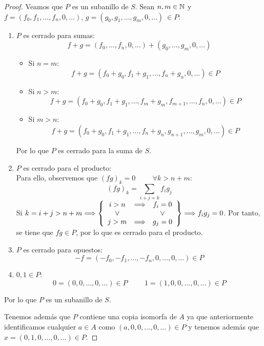 \begin{proof}
    
    Veamos que $P$ es un subanillo de $S$. Sean $n,m \in \mathbb N$ y $f=(f_0, f_1, \ldots, f_n, 0, \ldots)$, $g=(g_0, g_1, \ldots, g_m, 0, \ldots)~\in P$:
    \begin{enumerate}
        \item $P$ es cerrado para sumas:
        $$f+g = (f_0, \ldots, f_n, 0, \ldots) + (g_0, \ldots, g_m, 0, \ldots)$$
        \begin{itemize}
            \item Si $n = m$: $$f+g = (f_0 + g_0, f_1 + g_1, \ldots, f_n + g_n, 0, \ldots) \in P$$
            \item Si $n > m$: $$f+g = (f_0 + g_0, f_1 + g_1, \ldots, f_m + g_m, f_{m+1}, \ldots, f_n, 0, \ldots) \in P$$
            \item Si $m > n$: $$f+g = (f_0 + g_0, f_1 + g_1, \ldots, f_n + g_n, g_{n+1}, \ldots, g_m, 0, \ldots) \in P$$
        \end{itemize}
        Por lo que $P$ es cerrado para la suma de $S$.

        \item $P$ es cerrado para el producto:\\
        Para ello, observemos que $(fg)_k = 0 \hspace{1cm} \forall k > n+m$:
        $$(fg)_k = \sum_{i+j=k} f_i g_j$$
        Si $k = i+j > n+m \Longrightarrow 
        \left\{\begin{array}{ccc}
            i>n & \Longrightarrow & f_i=0\\
            \ \lor \  && \ \lor \ \\
            j>m & \Longrightarrow & g_j=0
        \end{array}\right\}
        \Longrightarrow f_i g_j = 0$.
        Por tanto, se tiene que $fg \in P$, por lo que es cerrado para el producto.

        \item $P$ es cerrado para opuestos:
        $$-f = (-f_0, -f_1, \ldots, -f_n, 0, \ldots, 0, \ldots) \in P$$

        \item $0,1\in P$:
        $$0 = (0, 0, \ldots, 0, \ldots) \in P \hspace{1cm} 1 = (1, 0, 0, \ldots, 0, \ldots) \in P$$
    \end{enumerate}
    
    Por lo que $P$ es un subanillo de $S$.

    
    Tenemos además que $P$ contiene una copia isomorfa de $A$ ya que anteriormente identificamos cualquier $a \in A$ como $(a, 0, 0, \ldots, 0, \ldots) \in P$ y tenemos además que $x = (0, 1, 0, \ldots, 0, \ldots) \in P$.


\end{proof}
